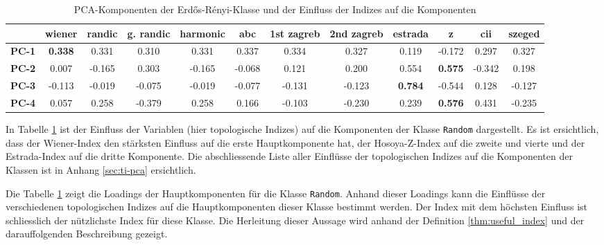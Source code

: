 \begin{table}[H]
    \caption{PCA-Komponenten der Erdős-Rényi-Klasse und der Einfluss der Indizes auf die Komponenten}
    \begin{adjustbox}{minipage=\textwidth, center}
        \tiny
        \begin{tabularx}{\textwidth}{l c c c c c c c c c c c}
            \hline
                          & wiener         & randic & g. randic & harmonic & abc    & 1st zagreb & 2nd zagreb & estrada        & z              & cii    & szeged \\ \hline
            \textbf{PC-1} & \textbf{0.338} & 0.331  & 0.310     & 0.331    & 0.337  & 0.334      & 0.327      & 0.119          & -0.172         & 0.297  & 0.327  \\
            \textbf{PC-2} & 0.007          & -0.165 & 0.303     & -0.165   & -0.068 & 0.121      & 0.200      & 0.554          & \textbf{0.575} & -0.342 & 0.198  \\
            \textbf{PC-3} & -0.113         & -0.019 & -0.075    & -0.019   & -0.077 & -0.131     & -0.123     & \textbf{0.784} & -0.544         & 0.128  & -0.127 \\
            \textbf{PC-4} & 0.057          & 0.258  & -0.379    & 0.258    & 0.166  & -0.103     & -0.230     & 0.239          & \textbf{0.576} & 0.431  & -0.235 \\ \hline
        \end{tabularx}
    \end{adjustbox}
    \label{table:pca_components}
\end{table}

In Tabelle \ref{table:pca_components} ist der Einfluss der Variablen (hier topologische Indizes) auf die Komponenten der Klasse \texttt{Random} dargestellt.
Es ist ersichtlich, dass der Wiener-Index den stärksten Einfluss auf die erste Hauptkomponente hat, der Hosoya-Z-Index auf die zweite und vierte und der Estrada-Index auf die dritte Komponente.
Die abschliessende Liste aller Einflüsse der topologischen Indizes auf die Komponenten der Klassen ist in Anhang \ref{sec:ti-pca} ersichtlich.

Die Tabelle \ref{table:pca_components} zeigt die Loadings der Hauptkomponenten für die Klasse \texttt{Random}. Anhand dieser Loadings kann die Einflüsse der verschiedenen topologischen Indizes auf die Hauptkomponenten dieser Klasse bestimmt werden. Der Index mit dem höchsten Einfluss ist schliesslich der nützlichste Index für diese Klasse. Die Herleitung dieser Aussage wird anhand der Definition \ref{thm:useful_index} und der darauffolgenden Beschreibung gezeigt.

